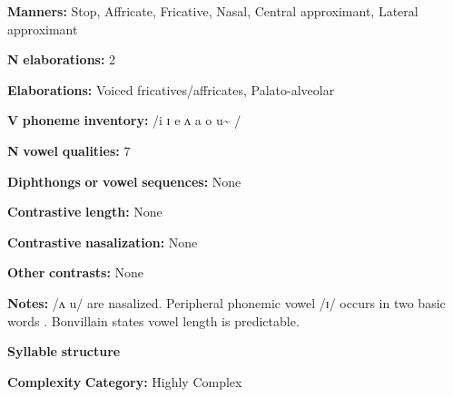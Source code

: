\documentclass[output=paper]{langsci/langscibook}
\begin{document}
\begin{styleBody}
\textbf{Manners:} Stop, Affricate, Fricative, Nasal, Central approximant, Lateral approximant
\end{styleBody}

\begin{styleBody}
\textbf{N} \textbf{elaborations:} 2
\end{styleBody}

\begin{styleBody}
\textbf{Elaborations:} Voiced fricatives/affricates, Palato-alveolar
\end{styleBody}

\begin{styleBody}
\textbf{V} \textbf{phoneme} \textbf{inventory:} /i ɪ e ʌ a o u\~{} /
\end{styleBody}

\begin{styleBody}
\textbf{N} \textbf{vowel} \textbf{qualities:} 7
\end{styleBody}

\begin{styleBody}
\textbf{Diphthongs} \textbf{or} \textbf{vowel} \textbf{sequences:} None
\end{styleBody}

\begin{styleBody}
\textbf{Contrastive} \textbf{length:} None
\end{styleBody}

\begin{styleBody}
\textbf{Contrastive} \textbf{nasalization:} None
\end{styleBody}

\begin{styleBody}
\textbf{Other} \textbf{contrasts:} None
\end{styleBody}

\begin{styleBody}
\textbf{Notes:} /ʌ u/ are nasalized. Peripheral phonemic vowel /ɪ/ occurs in two basic words \citep[43]{Bonvillain1973}. Bonvillain states vowel length is predictable.
\end{styleBody}

\begin{styleBody}
\textbf{Syllable} \textbf{structure}
\end{styleBody}

\begin{styleBody}
\textbf{Complexity} \textbf{Category:} Highly Complex
\end{styleBody}
\end{document}
